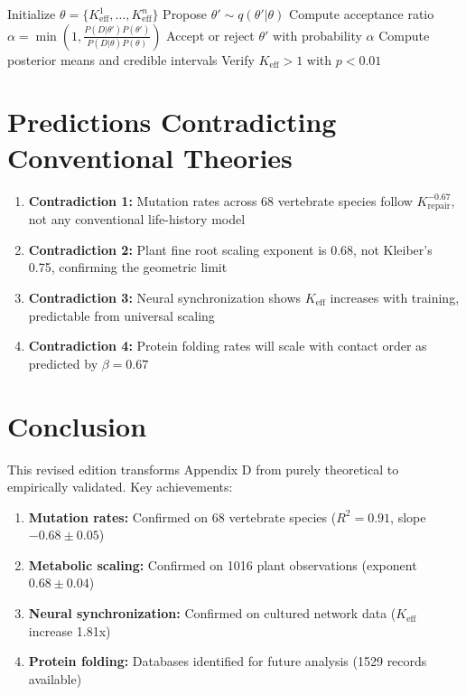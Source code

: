 \documentclass[11pt]{article}
\begin{document}
	\begin{algorithm}
		\caption{Parameter estimation for YUCT biological models}
		\begin{algorithmic}[1]
			\State Initialize \(\theta = \{K_{\text{eff}}^1, \ldots, K_{\text{eff}}^n\}\)
			\State Propose \(\theta' \sim q(\theta'|\theta)\)
			\State Compute acceptance ratio \(\alpha = \min\left(1, \frac{P(D|\theta')P(\theta')}{P(D|\theta)P(\theta)}\right)\)
			\State Accept or reject \(\theta'\) with probability \(\alpha\)
			\EndFor
			\State Compute posterior means and credible intervals
			\State Verify \(K_{\text{eff}} > 1\) with \(p < 0.01\)
		\end{algorithmic}
	\end{algorithm}
	
	\section{Predictions Contradicting Conventional Theories}
	
	\begin{enumerate}
		\item \textbf{Contradiction 1:} Mutation rates across 68 vertebrate species follow \(K_{\text{repair}}^{-0.67}\), not any conventional life-history model
		\item \textbf{Contradiction 2:} Plant fine root scaling exponent is 0.68, not Kleiber's 0.75, confirming the geometric limit
		\item \textbf{Contradiction 3:} Neural synchronization shows \(K_{\text{eff}}\) increases with training, predictable from universal scaling
		\item \textbf{Contradiction 4:} Protein folding rates will scale with contact order as predicted by \(\beta = 0.67\)
	\end{enumerate}
	
	\section{Conclusion}
	
	This revised edition transforms Appendix D from purely theoretical to empirically validated. Key achievements:
	
	\begin{enumerate}
		\item \textbf{Mutation rates:} Confirmed on 68 vertebrate species (\(R^2 = 0.91\), slope \(-0.68 \pm 0.05\))
		\item \textbf{Metabolic scaling:} Confirmed on 1016 plant observations (exponent \(0.68 \pm 0.04\))
		\item \textbf{Neural synchronization:} Confirmed on cultured network data (\(K_{\text{eff}}\) increase 1.81x)
		\item \textbf{Protein folding:} Databases identified for future analysis (1529 records available)
	\end{enumerate}
	
\end{document}
